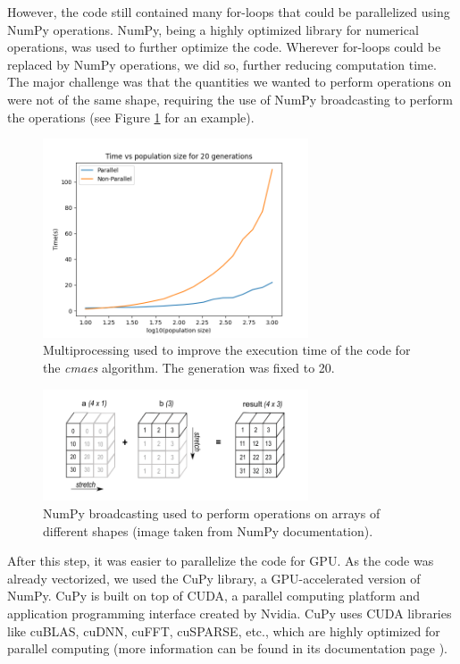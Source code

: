 \medskip

However, the code still contained many for-loops that could be parallelized using NumPy operations. NumPy, being a highly optimized library for numerical operations, was used to further optimize the code. Wherever for-loops could be replaced by NumPy operations, we did so, further reducing computation time. The major challenge was that the quantities we wanted to perform operations on were not of the same shape, requiring the use of NumPy broadcasting to perform the operations (see Figure \ref{fig:broadcasting} for an example).

\medskip

\begin{figure}[h]
    \centering
    \includegraphics[width=0.7\textwidth]{images/multiprocessing.png}
    \caption{Multiprocessing used to improve the execution time of the code for the \textit{cmaes} algorithm. The generation was fixed to 20.}
\end{figure}

\begin{figure}[h]
    \centering
    \includegraphics[width=0.7\textwidth]{images/broadcasting.png}
    \caption{NumPy broadcasting used to perform operations on arrays of different shapes (image taken from NumPy documentation).}
    \label{fig:broadcasting}
\end{figure}

\FloatBarrier

After this step, it was easier to parallelize the code for GPU. As the code was already vectorized, we used the CuPy library, a GPU-accelerated version of NumPy. CuPy is built on top of CUDA, a parallel computing platform and application programming interface created by Nvidia. CuPy uses CUDA libraries like cuBLAS, cuDNN, cuFFT, cuSPARSE, etc., which are highly optimized for parallel computing (more information can be found in its documentation page \cite{cupy}).

